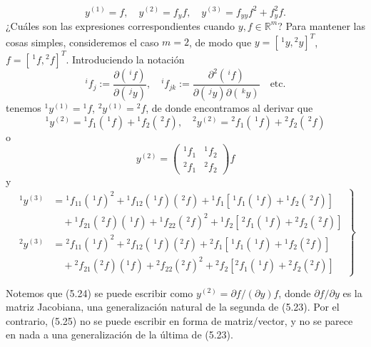 \begin{equation*}
y^{(1)} = f, \quad y^{(2)} = f_y f, \quad y^{(3)} = f_{yy} f^2 + f_y^2 f. \tag{5.23}
\end{equation*}
¿Cuáles son las expresiones correspondientes cuando $y, f \in \mathbb{R}^m$? Para mantener las cosas simples, consideremos el caso $m = 2$, de modo que $y = [\,\!^1y, \!^2y]^T$, $f = [\, \!^1f, \!^2f]^T$. Introduciendo la notación
\[
\!^i f_j := \frac{\partial (\, \!^i f)}{\partial (\, \!^j y)}, \quad \!^i f_{jk} := \frac{\partial^2 (\, \!^i f)}{\partial (\, \!^j y) \partial (\, \!^k y)} \quad \text{etc.}
\]
tenemos $\!^1 y^{(1)} = \!^1 f$, $\!^2 y^{(1)} = \!^2 f$, de donde encontramos al derivar que
\begin{equation*}
\!^1 y^{(2)} = \!^1 f_1 (\, \!^1 f) + \!^1 f_2 (\, \!^2 f), \quad \!^2 y^{(2)} = \!^2 f_1 (\, \!^1 f) + \!^2 f_2 (\, \!^2 f)
\end{equation*}
o
\begin{equation*}
y^{(2)} = \begin{pmatrix} \!^1 f_1 & \!^1 f_2 \\ \!^2 f_1 & \!^2 f_2 \end{pmatrix} f \tag{5.24}
\end{equation*}
y
\begin{equation*}
\left.
\begin{aligned}
\!^1 y^{(3)} &= \!^1 f_{11} (\, \!^1 f)^2 + \!^1 f_{12} (\, \!^1 f)(\, \!^2 f) + \!^1 f_1 \left[\, \!^1 f_1 (\, \!^1 f) + \!^1 f_2 (\, \!^2 f)\right] \\
&\quad + \!^1 f_{21} (\, \!^2 f)(\, \!^1 f) + \!^1 f_{22} (\, \!^2 f)^2 + \!^1 f_2 \left[\, \!^2 f_1 (\, \!^1 f) + \!^2 f_2 (\, \!^2 f)\right] \\
\!^2 y^{(3)} &= \!^2 f_{11} (\, \!^1 f)^2 + \!^2 f_{12} (\, \!^1 f)(^2 f) +\!^2 f_1 \left[\, \!^1 f_1 (\, \!^1 f) + \!^1 f_2 (^2 f)\right] \\
&\quad +\!^2 f_{21} (^2 f)(\!^1 f) +\!^2 f_{22} (^2 f)^2 +\!^2 f_2 \left[^2 f_1 (\, \!^1 f) +\!^2 f_2 (^2 f)\right]
\end{aligned}
\right\} \tag{5.25}
\end{equation*}

Notemos que (5.24) se puede escribir como $y^{(2)} = \partial f / (\partial y) f$, donde $\partial f / \partial y$ es la matriz Jacobiana, una generalización natural de la segunda de (5.23). Por el contrario, (5.25) no se puede escribir en forma de matriz/vector, y no se parece en nada a una generalización de la última de (5.23).

